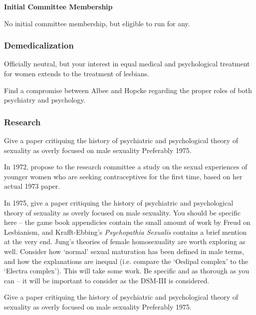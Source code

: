\begin{refsection}
\textbf{Initial Committee Membership}

No initial committee membership, but eligible to run for any.

\subsubsection{Demedicalization}
\label{demedicalization}

Officially neutral, but your interest in equal medical and psychological treatment for women extends to the treatment of lesbians.
\begin{proposal}\label{proposal:fordneysettlage}
Find a compromise between Albee and Hopcke regarding the proper roles of both psychiatry and psychology.
\end{proposal}

\subsubsection{Research}
\label{research}

\begin{researchtask}\label{researchtask:fordneysettlage}
Give a paper critiquing the history of psychiatric and psychological theory of sexuality as overly focused on male sexuality Preferably 1975.
\end{researchtask}

In 1972, propose to the research committee a study on the sexual experiences of younger women who are seeking contraceptives for the first time, based on her actual 1973 paper. 

In 1975, give a paper critiquing the history of psychiatric and psychological theory of sexuality as overly focused on male sexuality. You should be specific here – the game book appendicies contain the small amount of work by Freud on Lesbianism, and Krafft-Ebbing's \emph{Psychopathia Sexualis} contains a brief mention at the very end. Jung's theories of female homosexuality are worth exploring as well. Consider how `normal' sexual maturation has been defined in male terms, and how the explanations are inequal (i.e. compare the `Oedipal complex' to the `Electra complex'). This will take some work. Be specific and as thorough as you can – it will be important to consider as the DSM-III is considered.
\begin{writingtask}\label{writingtask:fordneysettlage}
Give a paper critiquing the history of psychiatric and psychological theory of sexuality as overly focused on male sexuality Preferably 1975.
\end{writingtask}


\end{refsection}
